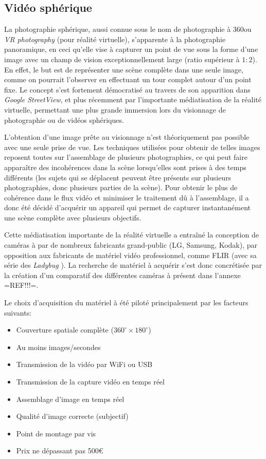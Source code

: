 		\subsection{Vidéo sphérique}
			La photographie sphérique, aussi connue sous le nom de photographie à 360\degre ou \emph{VR photography} (pour réalité virtuelle), s'apparente à la photographie panoramique, en ceci qu'elle vise à capturer un point de vue sous la forme d'une image avec un champ de vision exceptionnellement large (ratio supérieur à $1:2$)\cite{fnumpano}. En effet, le but est de représenter une scène complète dans une seule image, comme on pourrait l'observer en effectuant un tour complet autour d'un point fixe. Le concept s'est fortement démocratisé au travers de son apparition dans \emph{Google StreetView}, et plus récemment par l'importante médiatisation de la réalité virtuelle, permettant une plus grande immersion lors du visionnage de photographie ou de vidéos sphériques.
			\par
			L'obtention d'une image prête au visionnage n'est théoriquement pas possible avec une seule prise de vue. Les techniques utilisées pour obtenir de telles images reposent toutes sur l'assemblage de plusieurs photographies, ce qui peut faire apparaître des incohérences dans la scène lorsqu'elles sont prises à des temps différents (les sujets qui se déplacent peuvent être présents sur plusieurs photographies, donc plusieurs parties de la scène). Pour obtenir le plus de cohérence dans le flux vidéo et minimiser le traitement dû à l'assemblage, il a donc été décidé d'acquérir un appareil qui permet de capturer instantanément une scène complète avec plusieurs objectifs.
			\par
			Cette médiatisation importante de la réalité virtuelle a entraîné la conception de caméras à \degre par de nombreux fabricants grand-public (LG, Samsung, Kodak), par opposition aux fabricants de matériel vidéo professionnel, comme FLIR (avec sa série des \emph{Ladybug} \cite{ladybug}). La recherche de matériel à acquérir s'est donc concrétisée par la création d'un comparatif des différentes caméras à \degre présent dans l'annexe =REF!!!=.
			
			Le choix d'acquisition du matériel à été piloté principalement par les facteurs suivants:
			\begin{itemize}[noitemsep]
				\item Couverture spatiale complète ($360^{\circ}\times180^{\circ}$)
				\item Au moins  images/secondes
				\item Transmission de la vidéo par WiFi ou USB
				\item Transmission de la capture vidéo en temps réel
				\item Assemblage d'image en temps réel
				\item Qualité d'image correcte (subjectif)
				\item Point de montage par vis
				\item Prix ne dépassant pas 500\euro
			\end{itemize}
			
